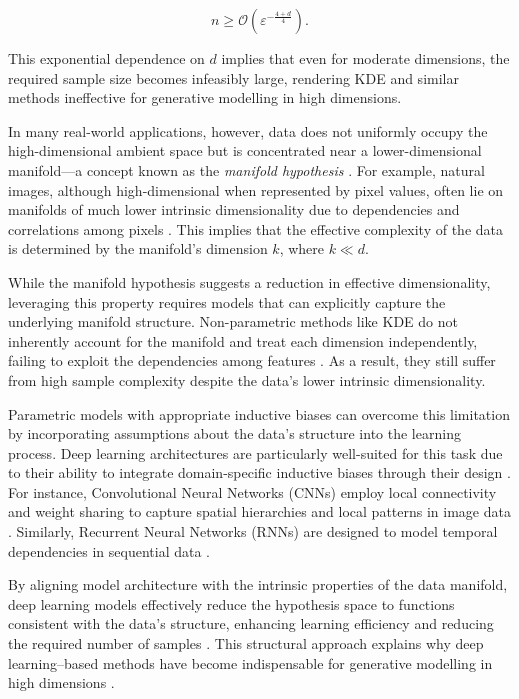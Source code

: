 \[
n \geq \mathcal{O}\left(\varepsilon^{-\frac{4 + d}{4}}\right).
\]

\noindent This exponential dependence on \( d \) implies that even for moderate dimensions, the required sample size becomes infeasibly large, rendering KDE and similar methods ineffective for generative modelling in high dimensions.

In many real-world applications, however, data does not uniformly occupy the high-dimensional ambient space but is concentrated near a lower-dimensional manifold—a concept known as the \emph{manifold hypothesis} \cite{fefferman2016testing}. For example, natural images, although high-dimensional when represented by pixel values, often lie on manifolds of much lower intrinsic dimensionality due to dependencies and correlations among pixels \cite{roweis2000nonlinear}. This implies that the effective complexity of the data is determined by the manifold's dimension \( k \), where \( k \ll d \).

While the manifold hypothesis suggests a reduction in effective dimensionality, leveraging this property requires models that can explicitly capture the underlying manifold structure. Non-parametric methods like KDE do not inherently account for the manifold and treat each dimension independently, failing to exploit the dependencies among features \cite{tenenbaum2000global}. As a result, they still suffer from high sample complexity despite the data's lower intrinsic dimensionality.

Parametric models with appropriate inductive biases can overcome this limitation by incorporating assumptions about the data's structure into the learning process. Deep learning architectures are particularly well-suited for this task due to their ability to integrate domain-specific inductive biases through their design \cite{lecun2015deep}. For instance, Convolutional Neural Networks (CNNs) employ local connectivity and weight sharing to capture spatial hierarchies and local patterns in image data \cite{lecun1998gradient}. Similarly, Recurrent Neural Networks (RNNs) are designed to model temporal dependencies in sequential data \cite{hochreiter1997long}.

By aligning model architecture with the intrinsic properties of the data manifold, deep learning models effectively reduce the hypothesis space to functions consistent with the data's structure, enhancing learning efficiency and reducing the required number of samples \cite{poggio2017theory}. This structural approach explains why deep learning–based methods have become indispensable for generative modelling in high dimensions \cite{goodfellow2016deep,kingma2013auto}.

